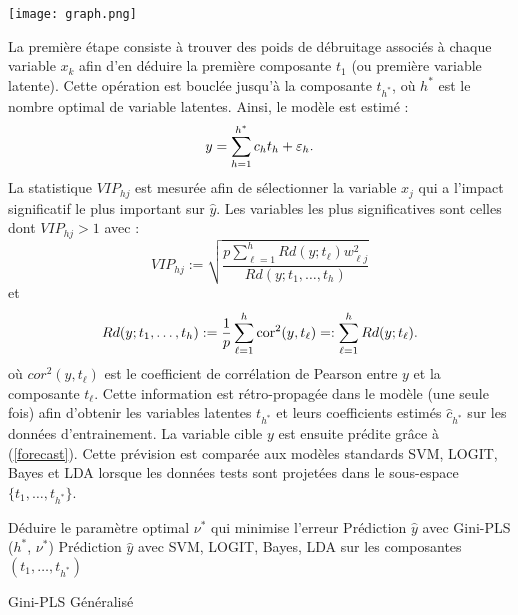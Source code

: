 \begin{center}
	\texttt{[image: graph.png]}
\end{center}


La première étape consiste à trouver des poids de débruitage associés à chaque variable $x_k$ afin d'en déduire la première composante $t_1$ (ou première variable latente). Cette opération est bouclée jusqu'à la composante $t_{h^*}$, où $h^*$ est le nombre optimal de variable latentes. Ainsi, le modèle est estimé :
\begin{equation}\label{forecast}
y=\sum_{h=1}^{h^*} c_ht_h +\varepsilon_h.
\end{equation}   
La statistique $VIP_{hj}$ est mesurée afin de sélectionner la variable $x_j$ qui a l'impact significatif le plus important sur $\hat{y}$. Les variables les plus significatives sont celles dont $VIP_{hj}>1$ avec :
\[
VIP_{hj} := \sqrt{\frac{p\sum_{\ell=1}^{h}Rd(y;t_\ell)w_{\ell j}^2}{Rd(y;t_1,\ldots,t_h)}} 
\] 
et 
\[
Rd(y; t_1,\ldots,t_h) := \frac{1}{p}\sum_{\ell=1}^{h}\text{cor}^2(y,t_\ell) =: \sum_{\ell=1}^{h}Rd(y;t_\ell).
\]
où $cor^2(y,t_\ell)$ est le coefficient de corrélation de Pearson entre $y$ et la composante $t_\ell$. Cette information est rétro-propagée dans le modèle (une seule fois) afin d'obtenir les variables latentes $t_{h^*}$ et leurs coefficients estimés $\hat{c}_{h^*}$ sur les données d'entrainement. La variable cible $y$ est ensuite prédite grâce à (\ref{forecast}). Cette prévision est comparée aux modèles standards SVM, LOGIT, Bayes et LDA lorsque les données tests sont projetées dans le sous-espace $\{t_1,\ldots,t_{h^*}\}$.\\


\begin{algorithm}[H]
	\scriptsize
	Déduire le paramètre optimal $\nu^*$ qui minimise l'erreur \; 
	\Return Prédiction $\hat{y}$ avec Gini-PLS ($h^*$, $\nu^*$) \;
	\Return Prédiction $\hat{y}$ avec SVM, LOGIT, Bayes, LDA sur les composantes $(t_1,\ldots,t_{h^*})$\;
	\caption{Gini-PLS Généralisé}\label{G-GPLS}
\end{algorithm}
\bigskip

